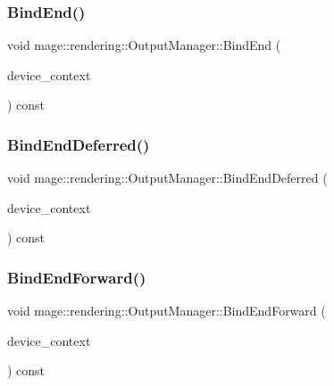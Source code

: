 \hypertarget{classmage_1_1rendering_1_1_output_manager_adf8fa859bb168ecf389d56b574a69dbd}{}\label{classmage_1_1rendering_1_1_output_manager_adf8fa859bb168ecf389d56b574a69dbd} 
\subsubsection{\texorpdfstring{Bind\+End()}{BindEnd()}}
{\footnotesize\ttfamily void mage\+::rendering\+::\+Output\+Manager\+::\+Bind\+End (\begin{DoxyParamCaption}\item[{I\+D3\+D11\+Device\+Context \&}]{device\+\_\+context }\end{DoxyParamCaption}) const\hspace{0.3cm}{\ttfamily [noexcept]}}

\hypertarget{classmage_1_1rendering_1_1_output_manager_af48d4e2671d7b84d3fd94961b926dd2a}{}\label{classmage_1_1rendering_1_1_output_manager_af48d4e2671d7b84d3fd94961b926dd2a} 
\subsubsection{\texorpdfstring{Bind\+End\+Deferred()}{BindEndDeferred()}}
{\footnotesize\ttfamily void mage\+::rendering\+::\+Output\+Manager\+::\+Bind\+End\+Deferred (\begin{DoxyParamCaption}\item[{I\+D3\+D11\+Device\+Context \&}]{device\+\_\+context }\end{DoxyParamCaption}) const\hspace{0.3cm}{\ttfamily [noexcept]}}

\hypertarget{classmage_1_1rendering_1_1_output_manager_ad0b43f26a2762ae116bc72b0cf21a6de}{}\label{classmage_1_1rendering_1_1_output_manager_ad0b43f26a2762ae116bc72b0cf21a6de} 
\subsubsection{\texorpdfstring{Bind\+End\+Forward()}{BindEndForward()}}
{\footnotesize\ttfamily void mage\+::rendering\+::\+Output\+Manager\+::\+Bind\+End\+Forward (\begin{DoxyParamCaption}\item[{I\+D3\+D11\+Device\+Context \&}]{device\+\_\+context }\end{DoxyParamCaption}) const\hspace{0.3cm}{\ttfamily [noexcept]}}


